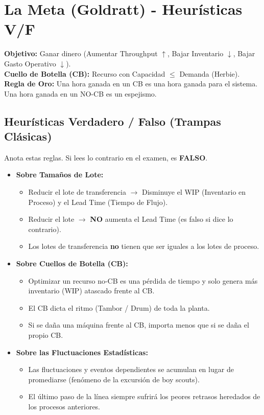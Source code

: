 \section{La Meta (Goldratt) - Heurísticas V/F}

\begin{tcolorbox}[colback=blue!5!white,colframe=blue!75!black,title=Mapa Mental Rápido (Cópialo)]
\textbf{Objetivo:} Ganar dinero (Aumentar Throughput $\uparrow$, Bajar Inventario $\downarrow$, Bajar Gasto Operativo $\downarrow$).\\
\textbf{Cuello de Botella (CB):} Recurso con Capacidad $\le$ Demanda (Herbie).\\
\textbf{Regla de Oro:} Una hora ganada en un CB es una hora ganada para el sistema. Una hora ganada en un NO-CB es un espejismo.
\end{tcolorbox}

\subsection{Heurísticas Verdadero / Falso (Trampas Clásicas)}
Anota estas reglas. Si lees lo contrario en el examen, es \textbf{FALSO}.

\begin{itemize}[itemsep=1ex]
    \item \textbf{Sobre Tamaños de Lote:}
    \begin{itemize}
        \item Reducir el lote de transferencia $\rightarrow$ Disminuye el WIP (Inventario en Proceso) y el Lead Time (Tiempo de Flujo).
        \item Reducir el lote $\rightarrow$ \textbf{NO} aumenta el Lead Time (es falso si dice lo contrario).
        \item Los lotes de transferencia \textbf{no} tienen que ser iguales a los lotes de proceso.
    \end{itemize}
    
    \item \textbf{Sobre Cuellos de Botella (CB):}
    \begin{itemize}
        \item Optimizar un recurso no-CB es una pérdida de tiempo y solo genera más inventario (WIP) atascado frente al CB.
        \item El CB dicta el ritmo (Tambor / Drum) de toda la planta.
        \item Si se daña una máquina frente al CB, importa menos que si se daña el propio CB.
    \end{itemize}
    
    \item \textbf{Sobre las Fluctuaciones Estadísticas:}
    \begin{itemize}
        \item Las fluctuaciones y eventos dependientes se acumulan en lugar de promediarse (fenómeno de la excursión de boy scouts).
        \item El último paso de la línea siempre sufrirá los peores retrasos heredados de los procesos anteriores.
    \end{itemize}
\end{itemize}

